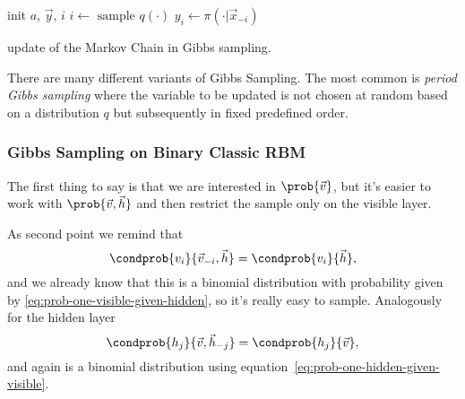   \begin{algorithm}[H]
    \DontPrintSemicolon
    
    
    init \(a\), \(\vec{y}\), \(i\)\;
    \(i \leftarrow \text{ sample } q{(\cdot)}\)\;
    \( y_i \leftarrow \pi{(\cdot|\vec{x}_{-i})}\)\;
    
    \caption{update of the Markov Chain in Gibbs sampling.}
    \label{alg:gibbs-sampling-general}
  \end{algorithm}
  There are many different variants of Gibbs Sampling. The most common is \emph{period Gibbs sampling}
  where the variable to be updated is not chosen at random based on a distribution \(q\) but
  subsequently in fixed predefined order. 
  
  
  \subsubsection{Gibbs Sampling on Binary Classic RBM}
  The first thing to say is that we are interested in \(\prob{\vec{v}}\), but it's easier to work
  with \(\prob{\vec{v},\vec{h}}\) and then restrict the sample only on the visible layer.
  
  As second point we remind that
  \[
    \condprob{v_i}{\vec{v}_{-i},\vec{h}} = \condprob{v_i}{\vec{h}},
  \]
  and we already know that this is a binomial distribution with probability given by \eqref{eq:prob-one-visible-given-hidden}, so it's really easy to sample.
  Analogously for the hidden layer
  \[
    \condprob{h_j}{\vec{v},\vec{h}_{-j}} = \condprob{h_j}{\vec{v}},
  \]
  and again is a binomial distribution using equation~\eqref{eq:prob-one-hidden-given-visible}.
  
